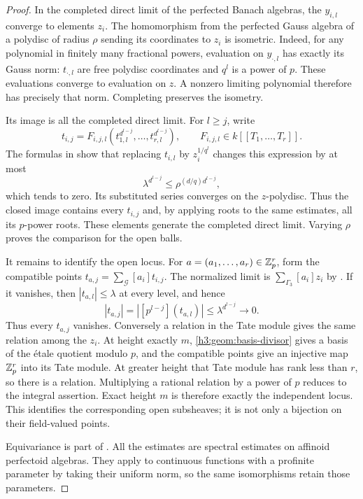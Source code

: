 \begin{proof}
In the completed direct limit of the perfected Banach algebras, the
$y_{i,l}$ converge to elements $z_i$.  The homomorphism from the
perfected Gauss algebra of a polydisc of radius $\rho$ sending its
coordinates to $z_i$ is isometric.  Indeed, for any polynomial in
finitely many fractional powers, evaluation on $y_{\cdot,l}$ has
exactly its Gauss norm: $t_{\cdot,l}$ are free polydisc coordinates
and $q^l$ is a power of $p$.  These evaluations converge to evaluation
on $z$.  A nonzero limiting polynomial therefore has precisely that
norm.  Completing preserves the isometry.

Its image is all the completed direct limit.  For $l\geq j$, write
\[
 t_{i,j}=F_{i,j,l}
 (t_{1,l}^{d^{l-j}},\ldots,t_{r,l}^{d^{l-j}}),
 \qquad F_{i,j,l}\in k[[T_1,\ldots,T_r]].
\]
The formulas in  show that replacing
$t_{i,l}$ by $z_i^{1/q^l}$ changes this expression by at most
\[
 \lambda^{d^{l-j}}
 \leq \rho^{(d/q)d^{l-j}},
\]
which tends to zero.  Its substituted series converges on the
$z$-polydisc.  Thus the closed image contains every $t_{i,j}$ and,
by applying roots to the same estimates, all its $p$-power roots.
These elements generate the completed direct limit.  Varying
$\rho$ proves the comparison for the open balls.

It remains to identify the open locus.  For
$a=(a_1,\ldots,a_r)\in\mathbb Z_p^r$, form the compatible points
$t_{a,j}=\sum_{\mathcal G}[a_i]t_{i,j}$.
The normalized limit is $\sum_{\Gamma_3}[a_i]z_i$ by
.  If it vanishes, then
$|t_{a,l}|\leq\lambda$ at every level, and hence
\[
 |t_{a,j}|=|[p^{l-j}](t_{a,l})|
       \leq\lambda^{d^{l-j}}\longrightarrow0.
\]
Thus every $t_{a,j}$ vanishes.  Conversely a relation in the Tate
module gives the same relation among the $z_i$.
At height exactly $m$, \eqref{h3:geom:basis-divisor} gives a basis of
the \'etale quotient modulo $p$, and the compatible points give an
injective map $\mathbb Z_p^r$ into its Tate module.  At greater height that
Tate module has rank less than $r$, so there is a relation.
Multiplying a rational relation by a power of $p$ reduces to the
integral assertion.  Exact height $m$ is therefore exactly the
independent locus.  This identifies the corresponding open
subsheaves; it is not only a bijection on their field-valued points.

Equivariance is part of .  All the
estimates are spectral estimates on affinoid perfectoid algebras.
They apply to continuous functions with a profinite parameter by
taking their uniform norm, so the same isomorphisms retain those
parameters.
\end{proof}

